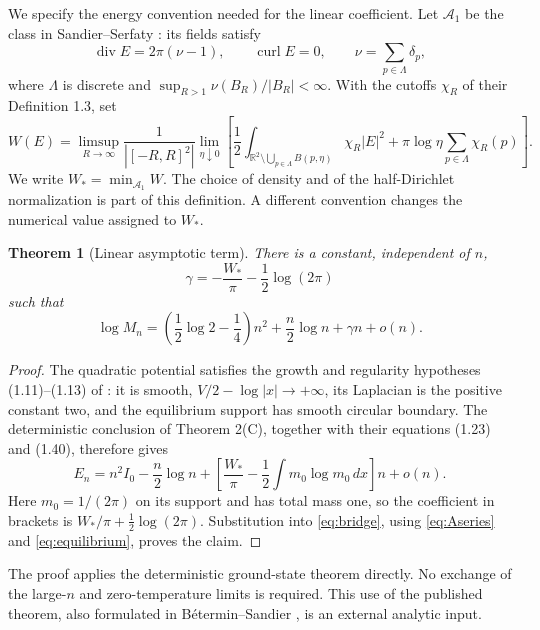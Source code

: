 \documentclass[11pt,a4paper]{article}
\newtheorem{theorem}{Theorem}[section]
\theoremstyle{remark}
\newcommand{\R}{\mathbb R}
\newcommand{\dd}{\,d}
\numberwithin{equation}{section}
\begin{document}
We specify the energy convention needed for the linear coefficient.
Let \(\mathcal A_1\) be the class in Sandier--Serfaty
\cite{SS}: its fields satisfy
\[
 \operatorname{div}E=2\pi(\nu-1),\qquad
 \operatorname{curl}E=0,\qquad
 \nu=\sum_{p\in\Lambda}\delta_p,
\]
where \(\Lambda\) is discrete and
\(\sup_{R>1}\nu(B_R)/|B_R|<\infty\).
With the cutoffs \(\chi_R\) of their Definition 1.3, set
\[
 W(E)=\limsup_{R\to\infty}\frac1{|[-R,R]^2|}
 \lim_{\eta\downarrow0}\left[
 \frac12\int_{\R^2\setminus\bigcup_{p\in\Lambda}B(p,\eta)}
                  \chi_R|E|^2
       +\pi\log\eta\sum_{p\in\Lambda}\chi_R(p)\right].
\]
We write \(W_*=\min_{\mathcal A_1}W\).
The choice of density and of the half-Dirichlet normalization is part
of this definition. A different convention changes the numerical
value assigned to \(W_*\).

\begin{theorem}[Linear asymptotic term]\label{thm:asymptotic}
There is a constant, independent of \(n\),
\begin{equation}\label{eq:gamma}
 \gamma=-\frac{W_*}{\pi}-\frac12\log(2\pi)
\end{equation}
such that
\begin{equation}\label{eq:asymptotic}
 \log M_n=\left(\frac12\log2-\frac14\right)n^2
                 +\frac n2\log n+\gamma n+o(n).
\end{equation}
\end{theorem}
\begin{proof}
The quadratic potential satisfies the growth and regularity
hypotheses (1.11)--(1.13) of \cite{SS}: it is smooth,
\(V/2-\log|x|\to+\infty\), its Laplacian is the positive constant two,
and the equilibrium support has smooth circular boundary.
The deterministic conclusion of Theorem 2(C), together with their
equations (1.23) and (1.40), therefore gives
\[
 E_n=n^2I_0-\frac n2\log n+
 \left[\frac{W_*}{\pi}-\frac12\int m_0\log m_0\dd x\right]n+o(n).
\]
Here \(m_0=1/(2\pi)\) on its support and has total mass one, so the
coefficient in brackets is \(W_*/\pi+\frac12\log(2\pi)\).
Substitution into \eqref{eq:bridge}, using \eqref{eq:Aseries} and
\eqref{eq:equilibrium}, proves the claim.
\end{proof}
The proof applies the deterministic ground-state theorem directly.
No exchange of the large-\(n\) and zero-temperature limits is required.
This use of the published theorem, also formulated in
B\'etermin--Sandier \cite{BS}, is an external analytic input.
\end{document}
